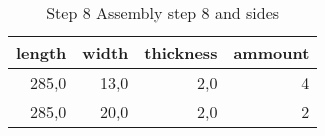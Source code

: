 \begin{table}[h!]
\centering
\caption{Step 8 Assembly step 8 and sides}
\begin{tabular}{rrrr}
\toprule
 length &  width &  thickness &  ammount \\
\midrule
  285,0 &   13,0 &        2,0 &        4 \\
  285,0 &   20,0 &        2,0 &        2 \\
\bottomrule
\end{tabular}
\end{table}
